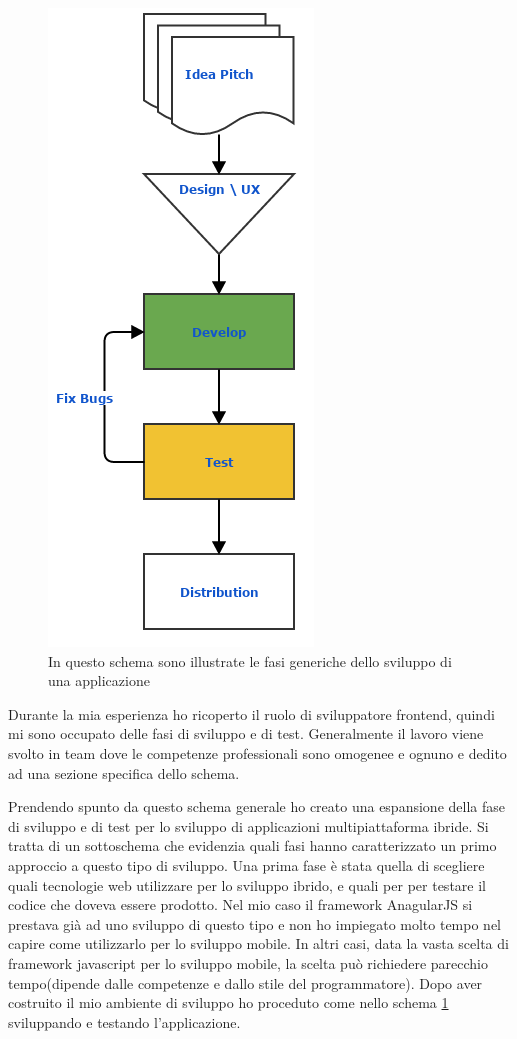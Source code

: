 \begin{figure}
	\begin{center}
		\includegraphics[scale=0.5]{Figures/classic_app_flow.png}
		\caption[Schema generale]{In questo schema sono illustrate le fasi generiche dello sviluppo di una applicazione}
		\label{fig:classic_app_flow}
	\end{center}
\end{figure}

Durante la mia esperienza ho ricoperto il ruolo di sviluppatore frontend, quindi mi sono occupato delle fasi di sviluppo e di test. Generalmente il lavoro viene svolto in team dove le competenze professionali sono omogenee e ognuno e dedito ad una sezione specifica dello schema.

Prendendo spunto da questo schema generale ho creato una espansione della fase di sviluppo e di test per lo sviluppo di applicazioni multipiattaforma ibride. Si tratta di un sottoschema che evidenzia quali fasi hanno caratterizzato un primo approccio a questo tipo di sviluppo.
Una prima fase è stata quella di scegliere quali tecnologie web utilizzare per lo sviluppo ibrido, e quali per per testare il codice che doveva essere prodotto. Nel mio caso il framework AnagularJS si prestava già ad uno sviluppo di questo tipo e non ho impiegato molto tempo nel capire come utilizzarlo per lo sviluppo mobile. In altri casi, data la vasta scelta di framework javascript per lo sviluppo mobile, la scelta può richiedere parecchio tempo(dipende dalle competenze e dallo stile del programmatore).
Dopo aver costruito il mio ambiente di sviluppo ho proceduto come nello schema \ref{fig:classic_app_flow} sviluppando e testando l'applicazione.

